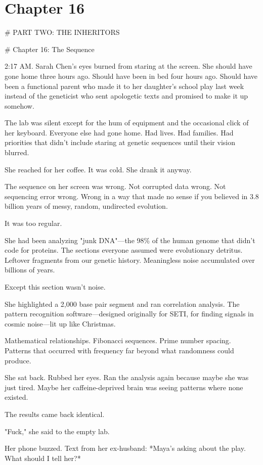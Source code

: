\chapter{Chapter 16}
\label{ch:16}

\# PART TWO: THE INHERITORS

\# Chapter 16: The Sequence

2:17 AM. Sarah Chen's eyes burned from staring at the screen. She should have gone home three hours ago. Should have been in bed four hours ago. Should have been a functional parent who made it to her daughter's school play last week instead of the geneticist who sent apologetic texts and promised to make it up somehow.

The lab was silent except for the hum of equipment and the occasional click of her keyboard. Everyone else had gone home. Had lives. Had families. Had priorities that didn't include staring at genetic sequences until their vision blurred.

She reached for her coffee. It was cold. She drank it anyway.

The sequence on her screen was wrong. Not corrupted data wrong. Not sequencing error wrong. Wrong in a way that made no sense if you believed in 3.8 billion years of messy, random, undirected evolution.

It was too regular.

She had been analyzing "junk DNA"—the 98\% of the human genome that didn't code for proteins. The sections everyone assumed were evolutionary detritus. Leftover fragments from our genetic history. Meaningless noise accumulated over billions of years.

Except this section wasn't noise.

She highlighted a 2,000 base pair segment and ran correlation analysis. The pattern recognition software—designed originally for SETI, for finding signals in cosmic noise—lit up like Christmas.

Mathematical relationships. Fibonacci sequences. Prime number spacing. Patterns that occurred with frequency far beyond what randomness could produce.

She sat back. Rubbed her eyes. Ran the analysis again because maybe she was just tired. Maybe her caffeine-deprived brain was seeing patterns where none existed.

The results came back identical.

"Fuck," she said to the empty lab.

Her phone buzzed. Text from her ex-husband: *Maya's asking about the play. What should I tell her?*

